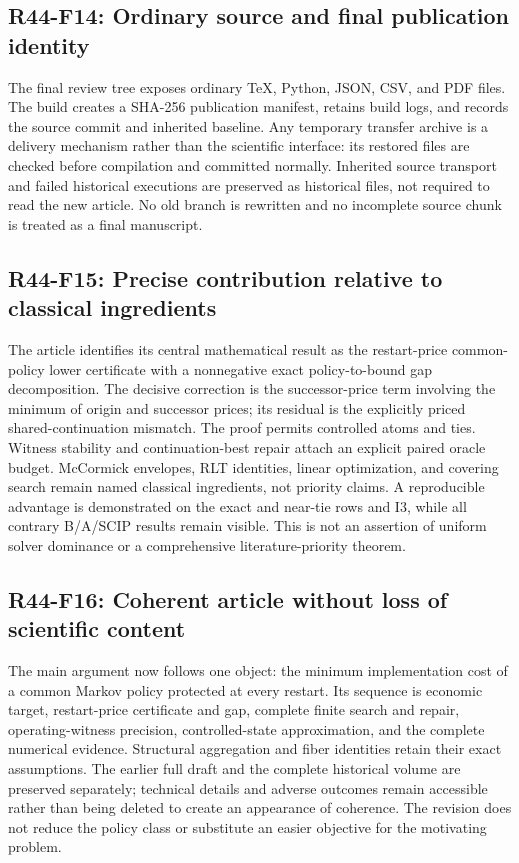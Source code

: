 \subsection{R44-F14: Ordinary source and final publication identity}
The final review tree exposes ordinary TeX, Python, JSON, CSV, and PDF files. The build creates a SHA-256 publication manifest, retains build logs, and records the source commit and inherited baseline. Any temporary transfer archive is a delivery mechanism rather than the scientific interface: its restored files are checked before compilation and committed normally. Inherited source transport and failed historical executions are preserved as historical files, not required to read the new article. No old branch is rewritten and no incomplete source chunk is treated as a final manuscript.

\subsection{R44-F15: Precise contribution relative to classical ingredients}
The article identifies its central mathematical result as the restart-price common-policy lower certificate with a nonnegative exact policy-to-bound gap decomposition. The decisive correction is the successor-price term involving the minimum of origin and successor prices; its residual is the explicitly priced shared-continuation mismatch. The proof permits controlled atoms and ties. Witness stability and continuation-best repair attach an explicit paired oracle budget. McCormick envelopes, RLT identities, linear optimization, and covering search remain named classical ingredients, not priority claims. A reproducible advantage is demonstrated on the exact and near-tie rows and I3, while all contrary B/A/SCIP results remain visible. This is not an assertion of uniform solver dominance or a comprehensive literature-priority theorem.

\subsection{R44-F16: Coherent article without loss of scientific content}
The main argument now follows one object: the minimum implementation cost of a common Markov policy protected at every restart. Its sequence is economic target, restart-price certificate and gap, complete finite search and repair, operating-witness precision, controlled-state approximation, and the complete numerical evidence. Structural aggregation and fiber identities retain their exact assumptions. The earlier full draft and the complete historical volume are preserved separately; technical details and adverse outcomes remain accessible rather than being deleted to create an appearance of coherence. The revision does not reduce the policy class or substitute an easier objective for the motivating problem.


